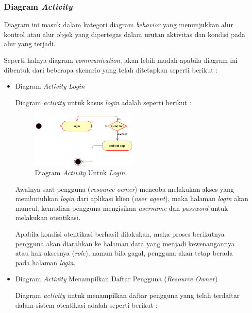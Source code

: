 \documentclass[pdftex,12pt, oneside]{article}
\begin{document}
\subsubsection{Diagram \textit{Activity}}

Diagram ini masuk dalam kategori diagram \textit{behavior} yang menunjukkan alur kontrol atau alur objek yang dipertegas dalam urutan aktivitas dan kondisi pada alur yang terjadi. 

Seperti halnya diagram \textit{communication}, akan lebih mudah apabila diagram ini dibentuk dari beberapa skenario yang telah ditetapkan seperti berikut :

\begin{itemize}
	\item Diagram \textit{Activity} \textit{Login}
	
	Diagram \textit{activity} untuk kasus \textit{login} adalah seperti berikut :
	
	\begin{figure}[H]
		\centering
		\includegraphics[width=0.5\textwidth]{./resources/act-dia-login}
		\caption{Diagram \textit{Activity} Untuk \textit{Login}}
		\label{fig:act-dia-login}
	\end{figure}
	
	Awalnya saat pengguna (\textit{resource owner}) mencoba melakukan akses yang membutuhkan \textit{login} dari aplikasi klien (\textit{user agent}), maka halaman \textit{login} akan muncul, kemudian pengguna mengisikan \textit{username} dan \textit{password} untuk melakukan otentikasi.
	
	Apabila kondisi otentikasi berhasil dilakukan, maka proses berikutnya pengguna akan diarahkan ke halaman data yang menjadi kewenangannya atau hak aksesnya (\textit{role}), namun bila gagal, pengguna akan tetap berada pada halaman \textit{login}.
	
	\item Diagram \textit{Activity} Menampilkan Daftar Pengguna (\textit{Resource Owner})

		Diagram \textit{activity} untuk menampilkan daftar pengguna yang telah terdaftar dalam sistem otentikasi adalah seperti berikut :
		

\end{itemize}
\end{document}
